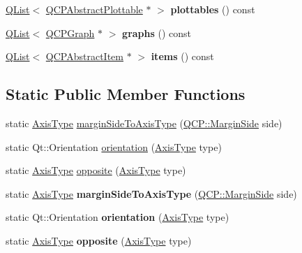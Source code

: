 \begin{DoxyCompactItemize}
\item 
\mbox{\label{class_q_c_p_axis_a920de983f542b7a616229235c9811846}} 
\hyperlink{class_q_list}{Q\+List}$<$ \hyperlink{class_q_c_p_abstract_plottable}{Q\+C\+P\+Abstract\+Plottable} $\ast$ $>$ {\bfseries plottables} () const
\item 
\mbox{\label{class_q_c_p_axis_a58f6c3460f20a614c0285e876deb73ce}} 
\hyperlink{class_q_list}{Q\+List}$<$ \hyperlink{class_q_c_p_graph}{Q\+C\+P\+Graph} $\ast$ $>$ {\bfseries graphs} () const
\item 
\mbox{\label{class_q_c_p_axis_ad16d3f1a7f10ea26c77a18120127dab5}} 
\hyperlink{class_q_list}{Q\+List}$<$ \hyperlink{class_q_c_p_abstract_item}{Q\+C\+P\+Abstract\+Item} $\ast$ $>$ {\bfseries items} () const
\end{DoxyCompactItemize}
\subsection*{Static Public Member Functions}
\begin{DoxyCompactItemize}
\item 
static \hyperlink{class_q_c_p_axis_ae2bcc1728b382f10f064612b368bc18a}{Axis\+Type} \hyperlink{class_q_c_p_axis_ac0a6b77bd52bec6c81cd62d167cfeba6}{margin\+Side\+To\+Axis\+Type} (\hyperlink{namespace_q_c_p_a7e487e3e2ccb62ab7771065bab7cae54}{Q\+C\+P\+::\+Margin\+Side} side)
\item 
static Qt\+::\+Orientation \hyperlink{class_q_c_p_axis_a9a68b3e45f1b1e33d4d807822342516c}{orientation} (\hyperlink{class_q_c_p_axis_ae2bcc1728b382f10f064612b368bc18a}{Axis\+Type} type)
\item 
static \hyperlink{class_q_c_p_axis_ae2bcc1728b382f10f064612b368bc18a}{Axis\+Type} \hyperlink{class_q_c_p_axis_aa85ba73dfee6483e23825461b725e363}{opposite} (\hyperlink{class_q_c_p_axis_ae2bcc1728b382f10f064612b368bc18a}{Axis\+Type} type)
\item 
\mbox{\label{class_q_c_p_axis_aad1924683216301698cfe1ed43c799c4}} 
static \hyperlink{class_q_c_p_axis_ae2bcc1728b382f10f064612b368bc18a}{Axis\+Type} {\bfseries margin\+Side\+To\+Axis\+Type} (\hyperlink{namespace_q_c_p_a7e487e3e2ccb62ab7771065bab7cae54}{Q\+C\+P\+::\+Margin\+Side} side)
\item 
\mbox{\label{class_q_c_p_axis_a9a68b3e45f1b1e33d4d807822342516c}} 
static Qt\+::\+Orientation {\bfseries orientation} (\hyperlink{class_q_c_p_axis_ae2bcc1728b382f10f064612b368bc18a}{Axis\+Type} type)
\item 
\mbox{\label{class_q_c_p_axis_aa22c33f3afe169962dc7abdbcd7d45d8}} 
static \hyperlink{class_q_c_p_axis_ae2bcc1728b382f10f064612b368bc18a}{Axis\+Type} {\bfseries opposite} (\hyperlink{class_q_c_p_axis_ae2bcc1728b382f10f064612b368bc18a}{Axis\+Type} type)
\end{DoxyCompactItemize}
